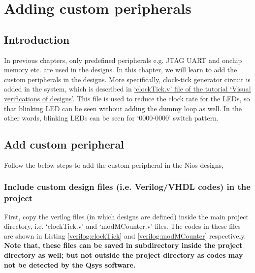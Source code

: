 \chapter{Adding custom peripherals} \label{ch:AddCustomPeripheral}

\graphicspath{{Chapters/NiosCustomIO/Figures/}}


\section{Introduction}
In previous chapters, only predefined peripherals e.g. JTAG UART and onchip memory etc. are used in the designs. In this chapter, we will learn to add the custom peripherals in the designs. More specifically, clock-tick generator circuit is added in the system, which is described in \href{http://pythondsp.blogspot.com/2016/10/chapter-5-verilog-visual-verifications.html#5.4-Clock-ticks}{`clockTick.v' file of the tutorial `Visual verifications of designs'}. This file is used to reduce the clock rate for the LEDs, so that blinking LED can be seen without adding the dummy loop as well. In the other words, blinking LEDs can be seen for `0000-0000' switch pattern. 

\section{Add custom peripheral}
Follow the below steps to add the custom peripheral in the Nios designs, 

\subsection{Include custom design files (i.e. Verilog/VHDL codes) in the project} 
First, copy the verilog files (in which designs are defined) inside the main project directory,  i.e. `clockTick.v' and `modMCounter.v' files. The codes in these files are shown in Listing \ref{verilog:clockTick} and \ref{verilog:modMCounter} respectively. \textbf{Note that, these files can be saved in subdirectory inside the project directory as well; but not outside the project directory as codes may not be detected by the Qsys software.}



